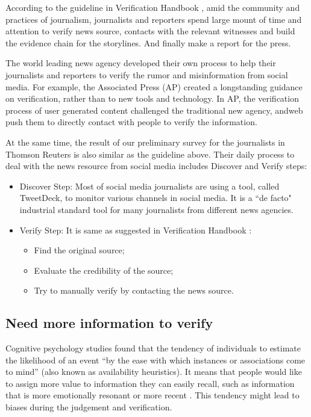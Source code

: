 According to the guideline in Verification Handbook \cite{Silverman2014}, amid the community and practices of journalism, journalists and reporters spend large mount of time and attention to verify news source, contacts with the relevant witnesses and build the evidence chain for the storylines. And finally make a report for the press. 

The world leading news agency developed their own process to help their journalists and reporters to verify the rumor and misinformation from social media. For example, the Associated Press (AP) created a longstanding guidance on verification, rather than to new tools and technology. In AP, the verification process of user generated content challenged the traditional new agency, andweb push them to directly contact with people to verify the information. 

At the same time, the result of our preliminary survey for the journalists in Thomson Reuters is also similar as the guideline above. Their daily process to deal with the news resource from social media includes Discover and Verify steps:

\begin{itemize}
  \item Discover Step: Most of social media journalists are using a tool, called TweetDeck, to monitor various channels in social media. It is a ``de facto" industrial standard tool for many journalists from different news agencies. 
\item Verify Step: It is same as suggested in Verification Handbook \cite{Silverman2014}: 
\begin{itemize}
  \item Find the original source; 
  \item Evaluate the credibility of the source;
  \item Try to manually verify by contacting the news source.
\end{itemize}
\end{itemize}


\subsection{Need more information to verify}

Cognitive psychology studies found that the tendency of individuals to estimate the likelihood of an event ``by the ease with which instances or associations come to mind” \cite{Tversky1973} (also known as availability heuristics). It means that people would like to assign more value to information they can easily recall, such as information that is more emotionally resonant or more recent \cite{Schwarz1991}. This tendency might lead to biases during the judgement and verification.  

